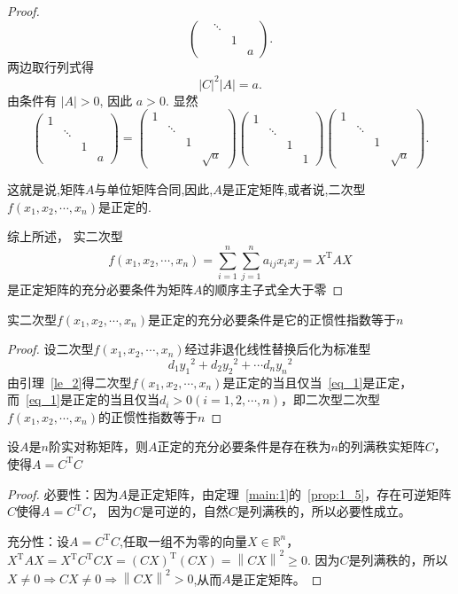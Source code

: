 \begin{proof}
\[\begin{pmatrix}
& \ddots & & \\
& & 1 & \\
& & & a
\end{pmatrix}.
\]
两边取行列式得
\[
|C|^2 |A| = a.
\]
由条件有 $|A|>0$, 因此 $a>0$. 显然
\[
\begin{pmatrix}
1 & & & \\
& \ddots & & \\
& & 1 & \\
& & & a
\end{pmatrix}
=
\begin{pmatrix}
1 & & & \\
& \ddots & & \\
& & 1 & \\
& & & \sqrt{a}
\end{pmatrix}
\begin{pmatrix}
1 & & & \\
& \ddots & & \\
& & 1 & \\
& & & 1
\end{pmatrix}
\begin{pmatrix}
1 & & & \\
& \ddots & & \\
& & 1 & \\
& & & \sqrt{a}
\end{pmatrix}.
\]

这就是说,矩阵$A$与单位矩阵合同,因此,$A$是正定矩阵,或者说,二次型$f(x_1, x_2, \cdots, x_n)$是正定的.

综上所述， 实二次型
    $$f(x_1,x_2,\cdots,x_n)=\sum_{i=1}^{n} \sum_{j=1}^{n} a_{ij}x_ix_j=X^\mathrm{T}AX$$
    是正定矩阵的充分必要条件为矩阵$A$的顺序主子式全大于零
\end{proof}
\begin{theorem}
    实二次型$f(x_1,x_2,\cdots,x_n)$是正定的充分必要条件是它的正惯性指数等于$n$
\end{theorem}
\begin{proof}
    设二次型$f(x_1,x_2,\cdots,x_n)$经过非退化线性替换后化为标准型
    \begin{equation}
        d_1{y_1}^2+d_2{y_2}^2+\cdots d_n{y_n}^2\label{eq_1}
    \end{equation}
    由引理~\ref{le_2}得二次型$f(x_1,x_2,\cdots,x_n)$是正定的当且仅当~\ref{eq_1}是正定，
    而~\ref{eq_1}是正定的当且仅当$d_i>0(i=1,2,\cdots,n)$，即二次型二次型$f(x_1,x_2,\cdots,x_n)$的正惯性指数等于$n$
\end{proof}
\begin{theorem}\label{theo_6}
    设$A$是$n$阶实对称矩阵，则$A$正定的充分必要条件是存在秩为$n$的列满秩实矩阵$C$，使得$A=C^\mathrm{T}C$
\end{theorem}
\begin{proof}
    必要性：因为$A$是正定矩阵，由定理~\ref{main:1}的~\ref{prop:1_5}，存在可逆矩阵$C$使得$A=C^\mathrm{T}C$，
    因为$C$是可逆的，自然$C$是列满秩的，所以必要性成立。

    充分性：设$A=C^\mathrm{T}C$,任取一组不为零的向量$X\in \mathbb{R}^n$，
    $X^\mathrm{T}AX=X^\mathrm{T}C^\mathrm{T}CX=(CX)^\mathrm{T}(CX)=\left\|CX\right\|^2\geqslant 0$.
    因为$C$是列满秩的，所以$X\neq 0\Rightarrow CX\neq 0 \Rightarrow\left\|CX\right\|^2>0$,从而$A$是正定矩阵。
\end{proof}